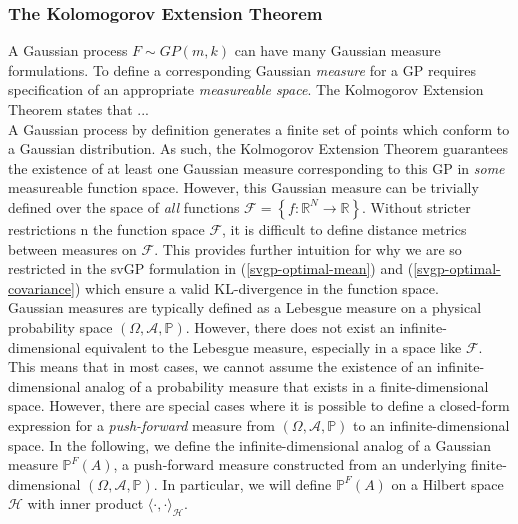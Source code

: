 \documentclass{article}
\numberwithin{equation}{section}
\begin{document}
\subsubsection{The Kolomogorov Extension Theorem}
A Gaussian process $F \sim GP(m, k)$ can have many Gaussian measure formulations. To define a corresponding Gaussian \textit{measure} for a GP requires specification of an appropriate \textit{measureable space}. The Kolmogorov Extension Theorem states that ...
\\ A Gaussian process by definition generates a finite set of points which conform to a Gaussian distribution. As such, the Kolmogorov Extension Theorem guarantees the existence of at least one Gaussian measure corresponding to this GP in \textit{some} measureable function space. However, this Gaussian measure can be trivially defined over the space of \textit{all} functions $\mathcal{F} = \left\{f: \mathbb{R}^{N} \rightarrow \mathbb{R} \right\}$. Without stricter restrictions n the function space $\mathcal{F}$, it is difficult to define distance metrics between measures on $\mathcal{F}$. This provides further intuition for why we are so restricted in the svGP formulation in (\ref{svgp-optimal-mean}) and (\ref{svgp-optimal-covariance}) which ensure a valid KL-divergence in the function space.
\\Gaussian measures are typically defined as a Lebesgue measure on a physical probability space $(\Omega, \mathcal{A}, \mathbb{P})$. However, there does not exist an infinite-dimensional equivalent to the Lebesgue measure, especially in a space like $\mathcal{F}$. This means that in most cases, we cannot assume the existence of an infinite-dimensional analog of a probability measure that exists in a finite-dimensional space. However, there are special cases where it is possible to define a closed-form expression for a \textit{push-forward} measure from $(\Omega, \mathcal{A}, \mathbb{P})$ to an infinite-dimensional space. In the following, we define the infinite-dimensional analog of a Gaussian measure  $\mathbb{P}^{F}(A)$, a push-forward measure constructed from an underlying finite-dimensional $(\Omega, \mathcal{A}, \mathbb{P})$. In particular, we will define $\mathbb{P}^{F}(A)$ on a Hilbert space $\mathcal{H}$ with inner product $\langle \cdot, \cdot \rangle_\mathcal{H}$.
\end{document}
